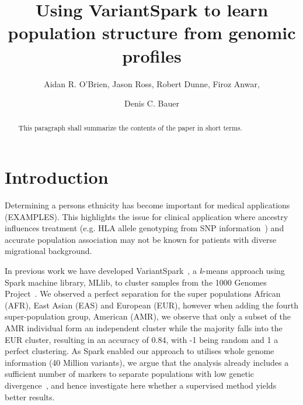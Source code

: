 \documentclass{llncs}
\newcommand{\variantSpark}{{\sc VariantSpark}}
\newcommand{\kMeans}{\textit{k}-means}
\begin{document}
\setcounter{save}{\value{section}}
{\def\addtocontents#1#2{}%
\def\addcontentsline#1#2#3{}%
\def\markboth#1#2{}%
%
\title{Using VariantSpark to learn population structure from genomic profiles}

\author{Aidan R. O'Brien, Jason Ross, Robert Dunne, Firoz Anwar, \and Denis C. Bauer}


\maketitle
%
\begin{abstract}
This paragraph shall summarize the contents of the paper
in short terms.
\end{abstract}
%
\section{Introduction}
%

Determining a persons ethnicity has become important for medical applications (EXAMPLES). This highlights the issue for clinical application where ancestry influences treatment (e.g. HLA allele genotyping from SNP information~\cite{Zheng2014}) and accurate population association may not be known for patients with diverse migrational background.


In previous work we have developed \variantSpark~\cite{OBrien}, a \kMeans{} approach using {\sc Spark} machine library, {\sc MLlib}, to cluster samples from the 1000 Genomes Project~\cite{1KG2012}.
We observed a perfect separation for the super populations African (AFR), East Asian (EAS) and European (EUR), however when adding the fourth super-population group, American (AMR), we observe that only a subset of the AMR individual form an independent cluster while the majority falls into the EUR cluster, resulting in an accuracy of 0.84, with -1 being random and 1 a perfect clustering.
As Spark enabled our approach to utilises whole genome information (40 Million variants), we argue that the analysis already includes a sufficient number of markers to separate populations with low genetic divergence~\cite{Patterson2006}, and hence investigate here whether a supervised method yields better results. 

}
\end{document}
